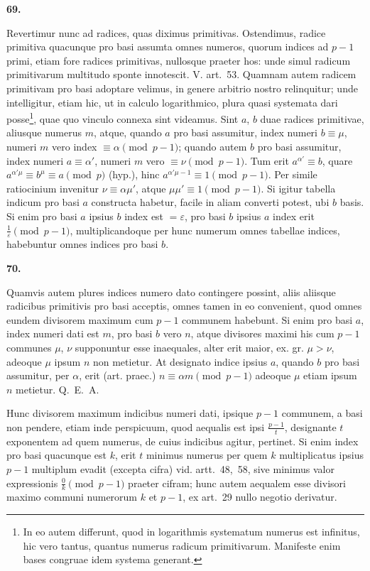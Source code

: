 \documentclass[12pt,a4paper]{article}
\theoremstyle{plain}
\theoremstyle{definition}
\theoremstyle{remark}
\begin{document}
\setcounter{satz}{69}
\addtocounter{satz}{-1}
\textbf{69.}

Revertimur nunc ad radices, quas diximus primitivas. Ostendimus, radice primitiva quacunque pro basi assumta omnes numeros, quorum indices ad $p-1$ primi, etiam fore radices primitivas, nullosque praeter hos: unde simul radicum primitivarum multitudo sponte innotescit. V. art.~53. Quamnam autem radicem primitivam pro basi adoptare velimus, in genere arbitrio nostro relinquitur; unde intelligitur, etiam hic, ut in calculo logarithmico, plura quasi systemata dari posse\footnote{In eo autem differunt, quod in logarithmis systematum numerus est infinitus, hic vero tantus, quantus numerus radicum primitivarum. Manifeste enim bases congruae idem systema generant.}, quae quo vinculo connexa sint videamus. Sint $a$, $b$ duae radices primitivae, aliusque numerus $m$, atque, quando $a$ pro basi assumitur, index numeri $b \equiv \mu$, numeri $m$ vero index $\equiv \alpha \pmod{p-1}$; quando autem $b$ pro basi assumitur, index numeri $a \equiv \alpha'$, numeri $m$ vero $\equiv \nu \pmod{p-1}$. Tum erit $a^{\alpha'} \equiv b$, quare $a^{\alpha'\mu} \equiv b^\mu \equiv a \pmod{p}$ (hyp.), hinc $a^{\alpha'\mu-1} \equiv 1 \pmod{p-1}$. Per simile ratiocinium invenitur $\nu \equiv \alpha \mu'$, atque $\mu \mu' \equiv 1 \pmod{p-1}$. Si igitur tabella indicum pro basi $a$ constructa habetur, facile in aliam converti potest, ubi $b$ basis. Si enim pro basi $a$ ipsius $b$ index est $=\varepsilon$, pro basi $b$ ipsius $a$ index erit $\frac{1}{\varepsilon} \pmod{p-1}$, multiplicandoque per hunc numerum omnes tabellae indices, habebuntur omnes indices pro basi $b$.

\setcounter{satz}{70}
\addtocounter{satz}{-1}
\textbf{70.}

Quamvis autem plures indices numero dato contingere possint, aliis aliisque radicibus primitivis pro basi acceptis, omnes tamen in eo convenient, quod omnes eundem divisorem maximum cum $p-1$ communem habebunt. Si enim pro basi $a$, index numeri dati est $m$, pro basi $b$ vero $n$, atque divisores maximi his cum $p-1$ communes $\mu$, $\nu$ supponuntur esse inaequales, alter erit maior, ex. gr. $\mu > \nu$, adeoque $\mu$ ipsum $n$ non metietur. At designato indice ipsius $a$, quando $b$ pro basi assumitur, per $\alpha$, erit (art. praec.) $n \equiv \alpha m \pmod{p-1}$ adeoque $\mu$ etiam ipsum $n$ metietur. Q.~E.~A.

Hunc divisorem maximum indicibus numeri dati, ipsique $p-1$ communem, a basi non pendere, etiam inde perspicuum, quod aequalis est ipsi $\frac{p-1}{t}$, designante $t$ exponentem ad quem numerus, de cuius indicibus agitur, pertinet. Si enim index pro basi quacunque est $k$, erit $t$ minimus numerus per quem $k$ multiplicatus ipsius $p-1$ multiplum evadit (excepta cifra) vid. artt.~48,~58, sive minimus valor expressionis $\frac{0}{k} \pmod{p-1}$ praeter cifram; hunc autem aequalem esse divisori maximo communi numerorum $k$ et $p-1$, ex art.~29 nullo negotio derivatur.
\end{document}
